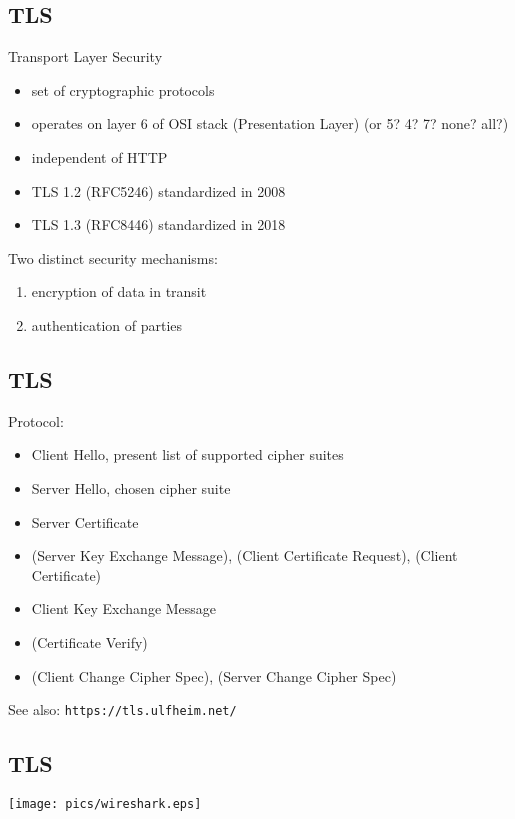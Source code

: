 \documentclass[xga]{xdvislides}
\begin{document}
\subsection{TLS}
Transport Layer Security
\begin{itemize}
	\item set of cryptographic protocols
	\item operates on layer 6 of OSI stack (Presentation Layer) (or 5? 4? 7? none? all?)
	\item independent of HTTP
	\item TLS 1.2 (RFC5246) standardized in 2008
	\item TLS 1.3 (RFC8446) standardized in 2018
\end{itemize}
\addvspace{.5in}
Two distinct security mechanisms:
\begin{enumerate}
	\item encryption of data in transit
	\item authentication of parties
\end{enumerate}

\subsection{TLS}
Protocol:
\begin{itemize}
	\item Client Hello, present list of supported cipher suites
	\item Server Hello, chosen cipher suite
	\item Server Certificate
	\item (Server Key Exchange Message), (Client Certificate Request), (Client Certificate)
	\item Client Key Exchange Message
	\item (Certificate Verify)
	\item (Client Change Cipher Spec), (Server Change Cipher Spec)
\end{itemize}
\vspace{.5in}
See also: \verb+https://tls.ulfheim.net/+

\subsection{TLS}
\begin{center}
	\texttt{[image: pics/wireshark.eps]}
\end{center}
\end{document}
